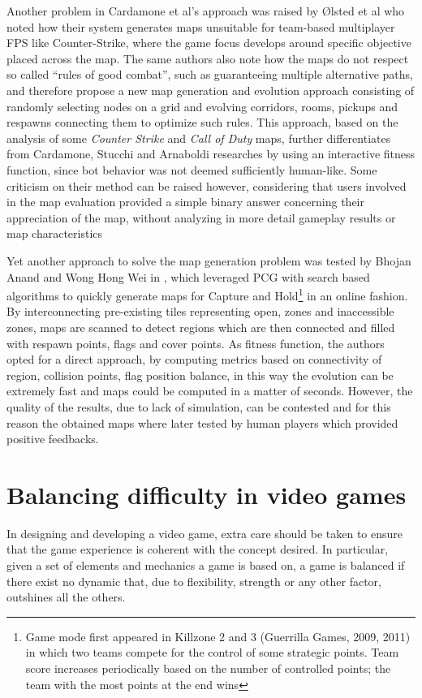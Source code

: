 Another problem in Cardamone et al’s approach was raised by Ølsted et al \cite{olsted_interactive_evolution_competitive} who noted how their system generates maps unsuitable for team-based multiplayer FPS like Counter-Strike, where the game focus develops around specific objective placed across the map. The same authors also note how the maps do not respect so called “rules of good combat”, such as guaranteeing multiple alternative paths, and therefore propose a new map generation and evolution approach consisting of randomly selecting nodes on a grid and evolving corridors, rooms, pickups and respawns connecting them to optimize such rules. 
This approach, based on the analysis of some \textit{Counter Strike} and \textit{Call of Duty} maps, further differentiates from Cardamone, Stucchi and Arnaboldi researches by using an interactive fitness function, since bot behavior was not deemed sufficiently human-like. Some criticism on their method can be raised however, considering that users involved in the map evaluation provided a simple binary answer concerning their appreciation of the map, without analyzing in more detail gameplay results or map characteristics 

Yet another approach to solve the map generation problem was tested by Bhojan Anand and Wong Hong Wei in \cite{bhojan_hong_arena}, which leveraged PCG with search based algorithms to quickly generate maps for Capture and Hold\footnote{Game mode first appeared in Killzone 2 and 3 (Guerrilla Games, 2009, 2011) in which two teams compete for the control of some strategic points. Team score increases periodically based on the number of controlled points; the team with the most points at the end wins} in an online fashion. By interconnecting pre-existing tiles representing open, zones and inaccessible zones, maps are scanned to detect regions which are then connected and filled with respawn points, flags and cover points. As fitness function, the authors opted for a direct approach, by computing metrics based on connectivity of region, collision points, flag position balance, in this way the evolution can be extremely fast and maps could be computed in a matter of seconds. However, the quality of the results, due to lack of simulation, can be contested and for this reason the obtained maps where later tested by human players which provided positive feedbacks.

\section{Balancing difficulty in video games}
In designing and developing a video game, extra care should be taken to ensure that the game experience is coherent with the concept desired. In particular, given a set of elements and mechanics a game is based on, a game is balanced if there exist no dynamic that, due to flexibility, strength or any other factor, outshines all the others. 

